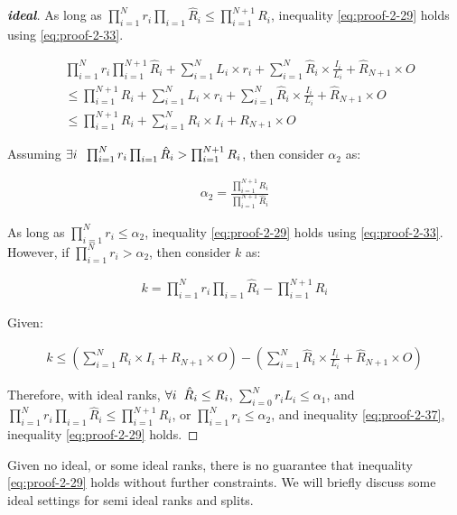 \documentclass{article}
\begin{document}
\begin{proof}[\textbf{ideal}]
	As long as $\prod_{i=1}^{N}r_i \prod_{i=1}\hat{R}_i\leq
	\prod_{i=1}^{N+1}R_i$, inequality \ref{eq:proof-2-29} holds using \ref{eq:proof-2-33}.
	
	\begin{align}
		\label{eq:proof-2-34}
		&\prod_{i=1}^{N}r_i \prod_{i=1}^{N+1}\hat{R}_i + \sum_{i=1}^{N}L_i\times r_i + \sum_{i=1}^{N} \hat{R}_i \times \frac{I_i}{L_i} + \hat{R}_{N+1}\times O 
		\nonumber\\
		&\leq
		\prod_{i=1}^{N+1}R_i + \sum_{i=1}^{N}L_i\times r_i + \sum_{i=1}^{N} \hat{R}_i \times \frac{I_i}{L_i} + \hat{R}_{N+1}\times O
		\nonumber\\
		&\leq
		\prod_{i=1}^{N+1}R_i + \sum_{i=1}^{N} R_i\times I_i + R_{N+1}\times O
	\end{align}

Assuming $\exists i\hspace{2mm}\prod_{i=1}^{N}r_i \prod_{i=1}\hat{R}_i > 
\prod_{i=1}^{N+1}R_i$, then consider $\alpha_2$ as:

\begin{align}
	\label{eq:proof-2-35}
	\alpha_2 = \frac{\prod_{i=1}^{N+1}R_i}{\prod_{i=1}^{N+1}\hat{R}_i}
\end{align}

As long as $\prod_{i=1}^{N}r_i \leq \alpha_2$, inequality \ref{eq:proof-2-29} holds using \ref{eq:proof-2-33}. However, if $\prod_{i=1}^{N}r_i > \alpha_2$, then consider $k$ as:

\begin{align}
	\label{eq:proof-2-36}
	k = \prod_{i=1}^{N}r_i \prod_{i=1}\hat{R}_i - \prod_{i=1}^{N+1}R_i
\end{align}

Given:

\begin{align}
	\label{eq:proof-2-37}
	k \leq \left(\sum_{i=1}^{N} R_i\times I_i + R_{N+1}\times O \right) - \left(\sum_{i=1}^{N} \hat{R}_i \times \frac{I_i}{L_i} + \hat{R}_{N+1}\times O\right)
\end{align}

Therefore, with ideal ranks, $\forall i \hspace{2mm}\hat{R}_i \leq R_i$, $\sum_{i=0}^{N} r_iL_i \leq \alpha_1$, and $\prod_{i=1}^{N}r_i \prod_{i=1}\hat{R}_i\leq
\prod_{i=1}^{N+1}R_i$, or $\prod_{i=1}^{N}r_i \leq \alpha_2$, and inequality \ref{eq:proof-2-37},  inequality \ref{eq:proof-2-29} holds.
\end{proof}

Given no ideal, or some ideal ranks, there is no guarantee that inequality \ref{eq:proof-2-29} holds without further constraints. We will briefly discuss some ideal settings for semi ideal ranks and splits.  
\end{document}
